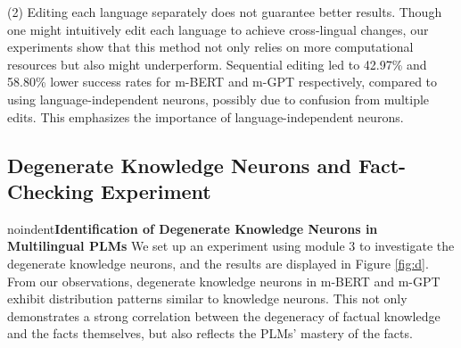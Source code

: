 \documentclass[]{article}
\newcommand{\vpara}[1]{noindent\textbf{#1 }}%
\begin{document}
(2) Editing each language separately does not guarantee better results. Though one might intuitively edit each language to achieve cross-lingual changes, our experiments show that this method not only relies on more computational resources but also might underperform. Sequential editing led to 42.97\% and 58.80\% lower success rates for m-BERT and m-GPT respectively, compared to using language-independent neurons, possibly due to confusion from multiple edits. This emphasizes the importance of language-independent neurons.
\begin{table}
\centering
{}
\caption{Results of cross-lingual knowledge editing. LIKN represents editing language-independent knowledge neurons, Mono-KN denotes editing knowledge neurons in one language's dataset corresponding to another, and Seq-KN denotes sequentially editing knowledge neurons in two languages. The symbol `\textuparrow` shows a success rate increase in LIKN over Mono-KN, represented as $\frac{\text{LIKN} - \text{Mono-KN}}{\text{Mono-KN}}$, and `\textdownarrow` indicates a decrease in LIKN compared to Seq-KN, represented as $\frac{\text{LIKN} - \text{Seq-KN}}{\text{LIKN}}$.}

\label{table:cross-lingual-edit}
\end{table}
\subsection{Degenerate Knowledge Neurons and Fact-Checking Experiment}
\vpara{Identification of Degenerate Knowledge Neurons in Multilingual PLMs}
We set up an experiment using module 3 to investigate the degenerate knowledge neurons, and the results are displayed in Figure \ref{fig:d}. From our observations, degenerate knowledge neurons in m-BERT and m-GPT exhibit distribution patterns similar to knowledge neurons. This not only demonstrates a strong correlation between the degeneracy of factual knowledge and the facts themselves, but also reflects the PLMs' mastery of the facts.
\end{document}
